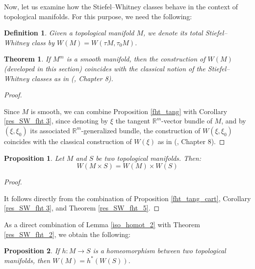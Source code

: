 \documentclass[12pt,oneside]{book}
\newtheorem{defi}   {Definition}[chapter]
\newtheorem{teo}    {Theorem}[chapter]
\newtheorem{prop}   {Proposition}[chapter]
\newcommand{\R}{\mathbb{R}}
\begin{document}
    Now, let us examine how the Stiefel–Whitney classes behave in the context of topological 
    manifolds. For this purpose, we need the following:

    \begin{defi}\label{defi_SW_top}
    	Given a topological manifold $M$, we denote its total Stiefel–Whitney class by $W(M)=W(\tau M,\tau_{0}M)$.
    \end{defi}

    \begin{teo}\label{SW_var_suave}
    	If $M^{m}$ is a smooth manifold, then the construction of $W(M)$ (developed in this section) coincides with the classical notion of the Stiefel–Whitney classes as in (\cite{milnor_1}, Chapter 8).
    \end{teo}
    \begin{proof}

        \

    	Since $M$ is smooth, we can combine Proposition \ref{fht_tang} with Corollary \ref{res_SW_fht 3}, since denoting by $\xi$ the 
        tangent $\R^{m}$-vector bundle of $M$, and by $(\xi,\xi_{0})$ its associated $\R^{m}$-generalized bundle, 
        the construction of $W(\xi,\xi_{0})$ coincides with the classical construction of $W(\xi)$ as in (\cite{milnor_1}, Chapter 8).

    \end{proof}

    \begin{prop}\label{res_SW_fht_8}
	Let $M$ and $S$ be two topological manifolds. Then:
	$$ W(M\times S)=W(M)\times W(S) $$
    \end{prop}

    \begin{proof}

        \
    
    	It follows directly from the combination of Proposition \ref{fht_tang_cart}, Corollary \ref{res_SW_fht 3}, and Theorem 
        \ref{res_SW_fht_5}.
    
    \end{proof}

    As a direct combination of Lemma \ref{iso_homot_2} with Theorem \ref{res_SW_fht_2}, we obtain the following:

    \begin{prop}\label{res_SW_fht_9}
    	If $h:M\to S$ is a homeomorphism between two topological manifolds, then $W(M)=h^{*}(W(S))$.
    \end{prop}
\end{document}
